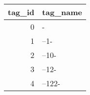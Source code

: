 \begin{tabular}{rl}
\toprule
 tag\_id & tag\_name \\
\midrule
      0 &        - \\
      1 &     --1- \\
      2 &    --10- \\
      3 &    --12- \\
      4 &   --122- \\
\bottomrule
\end{tabular}
